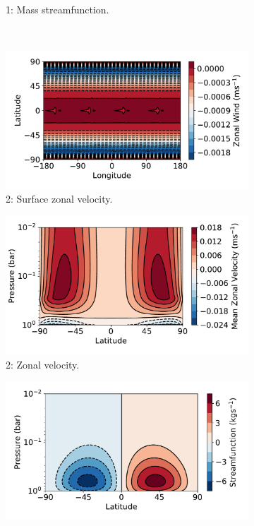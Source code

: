 \begin{figure}
\begin{subfigure}[t]{0.31\textwidth}
    \caption{1: Mass streamfunction.}
  \end{subfigure}
  \\
  \begin{subfigure}[t]{0.31\textwidth}
    \includegraphics[width=\textwidth]{figures/eqm-zonal-flow/zonal-wind-map-axi-day1.pdf}
    \caption{2: Surface zonal velocity.}
  \end{subfigure}
\enskip
  \begin{subfigure}[t]{0.31\textwidth}
    \includegraphics[width=\textwidth]{figures/eqm-zonal-flow/zonal-wind-axi-day1.pdf}
    \caption{2: Zonal velocity.}
  \end{subfigure}
\enskip
  \begin{subfigure}[t]{0.31\textwidth}
    \includegraphics[width=\textwidth]{figures/eqm-zonal-flow/streamfunction-axi-day1.pdf}

\end{subfigure}
\end{figure}
